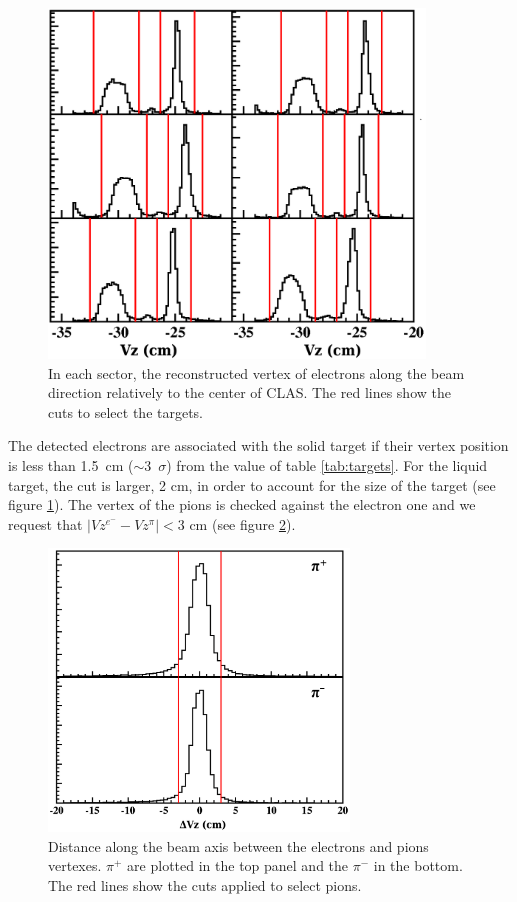 \begin{figure}[p]
\centering
\includegraphics[width=10cm] {chap5-fig/Vertex_el_data.png}
\caption {In each sector, the reconstructed vertex of electrons along the beam
direction relatively to the center of CLAS. The red lines show the cuts 
to select the targets.}
\label{vertex}
\end{figure}

The detected electrons are associated with the solid target if their vertex 
position is less than 1.5~cm ($\sim$3~$\sigma$) from the value of table 
\ref{tab:targets}. For the liquid target, the cut is larger, 2 cm, in order to 
account for the size of the target (see figure \ref{vertex}). The vertex of 
the pions is checked against the electron one and we request that 
$| Vz^{e^-} - Vz^{\pi} | < 3$ cm (see figure \ref{fig:dvzpi}).

\begin{figure}[tbp]
\centering
\includegraphics[width=8cm] {chap5-fig/Vertex_pi_data.png}
\caption {Distance along the beam axis between the electrons and pions 
vertexes. $\pi^+$ are plotted in the top panel and the $\pi^-$ in the bottom.
The red lines show the cuts applied to select pions.}
\label{fig:dvzpi}
\end{figure}

